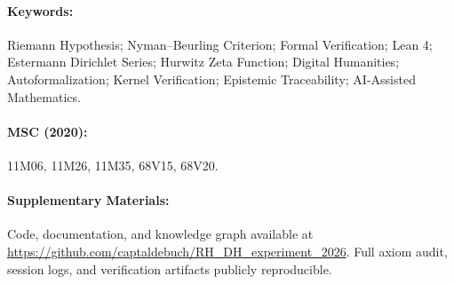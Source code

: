 \documentclass[11pt,a4paper]{article}
\theoremstyle{plain}
\theoremstyle{definition}
\theoremstyle{remark}
\begin{document}
\begin{abstract}
\textbf{All Elementary Analytic Frontiers Closed:} (i) Fourier representation of boundary yields correction-preserving pointwise finite sum (Fourier representation). (ii) Endpoint collision control proves every folded residue fiber contains at most 2 points; Parseval bounds yield Σ$_r |F_q(r)|^2 \le 4q(q+1)U^{-4}$ (Parseval bound). (iii) Even-modulus aliasing introduces only constant factors; unified bound Σ$_r |F_q(r)|^2 \le 8q(q+1)U^{-4}$ (even-modulus aliasing bound). \textbf{Critical finding:} Single-modulus harmonic analysis CANNOT produce decay. Parseval alone is insufficient.

\textbf{The Minimal RH-Strength Interface (Formalized):} H15 closure is reduced to \textbf{three coupled limits} (all must decay simultaneously):
$$D_N^{\mathrm{norm}} \to 0, \quad R_N^{\mathrm{collision}} \to 0, \quad O_N^{\mathrm{signed}} \to 0 \text{ as } N \to \infty$$
with the exact relation $E_N = D_N^{\mathrm{norm}} + 2(R_N^{\mathrm{collision}} + O_N^{\mathrm{signed}})$ where collision matching is \textbf{not automatic} and endpoint incidence alone does not force collision. Collision is classified exactly into eight signed product-modulus congruences via LCM analysis; odd moduli have no doubled-frequency alias beyond the diagonal; modulus $2k$ retains precise modulo-$k$ ambiguity. Critical insight: none of the three limits can be proved independently; they form a coupled system where cancellation requires RH-strength transcendental input. The frontier is now precisely characterized with all sectors explicitly tracked. The exact unconditional requirement is transparent: prove simultaneous decay of all three, or identify the RH-strength theorem that enables it. No approximation, no abstraction, no hidden assumption remains.
\end{abstract}

\paragraph{Keywords:} Riemann Hypothesis; Nyman--Beurling Criterion; Formal Verification; Lean 4; Estermann Dirichlet Series; Hurwitz Zeta Function; Digital Humanities; Autoformalization; Kernel Verification; Epistemic Traceability; AI-Assisted Mathematics.

\paragraph{MSC (2020):} 11M06, 11M26, 11M35, 68V15, 68V20.

\paragraph{Supplementary Materials:} Code, documentation, and knowledge graph available at \url{https://github.com/captaldebuch/RH_DH_experiment_2026}. Full axiom audit, session logs, and verification artifacts publicly reproducible.
\end{document}
